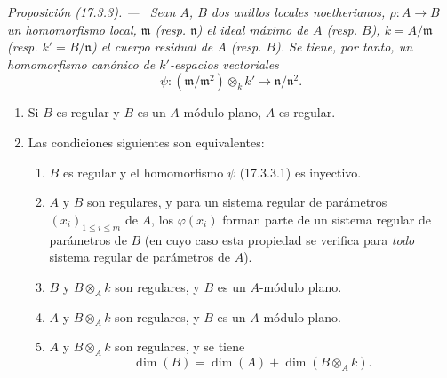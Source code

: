 \documentclass[10pt,oneside]{book}
\makeatletter
\newcommand{\setmanualcurrentlabel}[1]{\def\@currentlabel{#1}}
\newenvironment{proposition}[1][]{%
  \setmanualcurrentlabel{#1}\par\medskip\noindent\itshape Proposición (#1). ---\ }{\par}
\makeatother
\begin{document}
\begin{proposition}[17.3.3]
\label{0.17.3.3-es}
Sean $A$, $B$ dos anillos locales noetherianos,
$\rho:A\longrightarrow B$ un homomorfismo local, $\mathfrak{m}$ \textup{(resp.
$\mathfrak n$)} el ideal máximo de $A$ \textup{(resp. $B$)},
$k=A/\mathfrak{m}$ \textup{(resp. $k'=B/\mathfrak{n}$)} el cuerpo residual de $A$
\textup{(resp. $B$)}. Se tiene, por tanto, un homomorfismo canónico de $k'$-espacios
vectoriales
\begin{equation}
\label{0.17.3.3.1-es}
\tag{17.3.3.1}
  \psi:(\mathfrak{m}/\mathfrak{m}^2)\otimes_k k'
  \longrightarrow\mathfrak{n}/\mathfrak{n}^2.
\end{equation}
\begin{enumerate}
  \item[\rm (i)] Si $B$ es regular y $B$ es un $A$-módulo plano, $A$ es
  regular.
  \item[\rm (ii)] Las condiciones siguientes son equivalentes:
  \begin{enumerate}
    \item[\textit{a)}] $B$ es regular y el homomorfismo $\psi$ \textup{(17.3.3.1)} es
    inyectivo.
    \item[\textit{b)}] $A$ y $B$ son regulares, y para un sistema regular de
    parámetros $(x_i)_{1\leq i\leq m}$ de $A$, los $\varphi(x_i)$ forman parte
    de un sistema regular de parámetros de $B$ \textup{(en cuyo caso esta propiedad se
    verifica para \emph{todo} sistema regular de parámetros de $A$)}.
    \item[\textit{c)}] $B$ y $B\otimes_A k$ son regulares, y $B$ es un $A$-módulo
    plano.
    \item[\textit{d)}] $A$ y $B\otimes_A k$ son regulares, y $B$ es un $A$-módulo
    plano.
    \item[\textit{e)}] $A$ y $B\otimes_A k$ son regulares, y se tiene
    \begin{equation}
    \label{0.17.3.3.2-es}
    \tag{17.3.3.2}
      \dim(B)=\dim(A)+\dim(B\otimes_A k).
    \end{equation}
  \end{enumerate}
\end{enumerate}
\end{proposition}
\end{document}
